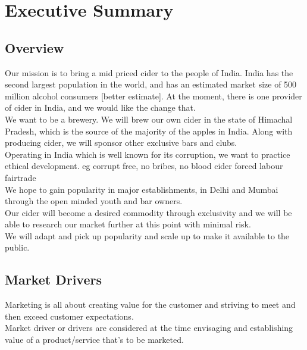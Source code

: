 \documentclass[11pt]{article}
\begin{document}
\section{Executive Summary}
  \subsection{Overview}

Our mission is to bring a mid priced cider to the people of India. India has the second largest population in the world, and has an estimated market size of 500 million alcohol consumers [better estimate]. At the moment, there is one provider of cider in India, and we would like the change that. \\

\noindent We want to be a brewery. We will brew our own cider in the state of Himachal Pradesh, which is the source of the majority of the apples in India. Along with producing cider, we will sponsor other exclusive bars and clubs. \\

\noindent Operating in India which is well known for its corruption, we want to practice ethical development. eg corrupt free, no bribes, no blood cider forced labour fairtrade \\

\noindent We hope to gain popularity in major establishments, in Delhi and Mumbai through the open minded youth and bar owners. \\

\noindent Our cider will become a desired commodity through exclusivity and we will be able to research our market further at this point with minimal risk. \\

\noindent We will adapt and pick up popularity and scale up to make it available to the public.

  \subsection{Market Drivers}
Marketing is all about creating value for the customer and striving to meet and then exceed customer expectations.\\

\noindent Market driver or drivers are considered at the time envisaging and establishing value of a product/service that's to be marketed. \\
\end{document}

